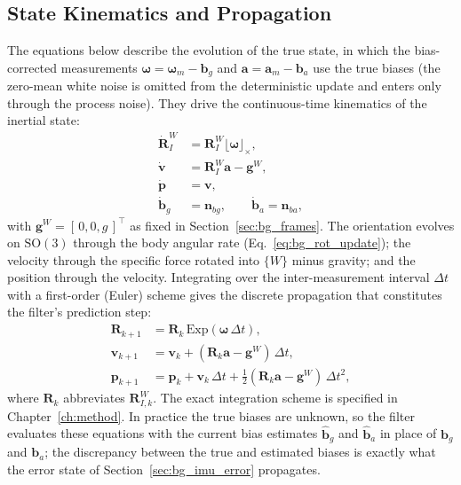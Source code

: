 \subsection{State Kinematics and Propagation}
\label{sec:bg_imu_kin}
The equations below describe the evolution of the true state, in which the bias-corrected measurements $\boldsymbol{\omega} = \boldsymbol{\omega}_m - \mathbf{b}_g$ and $\mathbf{a} = \mathbf{a}_m - \mathbf{b}_a$ use the true biases (the zero-mean white noise is omitted from the deterministic update and enters only through the process noise). They drive the continuous-time kinematics of the inertial state:
\begin{align}
  \dot{\mathbf{R}}_I^W &= \mathbf{R}_I^W \lfloor\boldsymbol{\omega}\rfloor_\times, \\
  \dot{\mathbf{v}} &= \mathbf{R}_I^W \mathbf{a} - \mathbf{g}^{W}, \\
  \dot{\mathbf{p}} &= \mathbf{v}, \\
  \dot{\mathbf{b}}_g &= \mathbf{n}_{bg}, \qquad \dot{\mathbf{b}}_a = \mathbf{n}_{ba},
\end{align}
with $\mathbf{g}^{W} = [\,0, 0, g\,]^\top$ as fixed in Section~\ref{sec:bg_frames}. The orientation evolves on $\mathrm{SO}(3)$ through the body angular rate (Eq.~\ref{eq:bg_rot_update}); the velocity through the specific force rotated into $\{W\}$ minus gravity; and the position through the velocity. Integrating over the inter-measurement interval $\Delta t$ with a first-order (Euler) scheme gives the discrete propagation that constitutes the filter's prediction step:
\begin{align}
  \mathbf{R}_{k+1} &= \mathbf{R}_k\,\mathrm{Exp}(\boldsymbol{\omega}\,\Delta t), \\
  \mathbf{v}_{k+1} &= \mathbf{v}_k + (\mathbf{R}_k\mathbf{a} - \mathbf{g}^{W})\,\Delta t, \\
  \mathbf{p}_{k+1} &= \mathbf{p}_k + \mathbf{v}_k\,\Delta t + \tfrac{1}{2}(\mathbf{R}_k\mathbf{a} - \mathbf{g}^{W})\,\Delta t^2,
\end{align}
where $\mathbf{R}_k$ abbreviates $\mathbf{R}_{I,k}^W$. The exact integration scheme is specified in Chapter~\ref{ch:method}. In practice the true biases are unknown, so the filter evaluates these equations with the current bias estimates $\hat{\mathbf{b}}_g$ and $\hat{\mathbf{b}}_a$ in place of $\mathbf{b}_g$ and $\mathbf{b}_a$; the discrepancy between the true and estimated biases is exactly what the error state of Section~\ref{sec:bg_imu_error} propagates.

